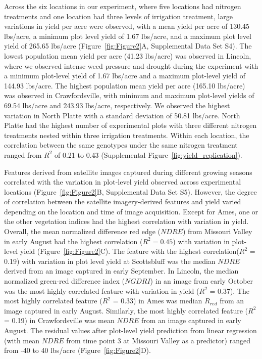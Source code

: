 \documentclass[12pt,twoside]{gsag3jnl}
\begin{document}
Across the six locations in our experiment, where five locations had nitrogen treatments and one location had three levels of irrigation treatment, large variations in yield per acre were observed, with a mean yield per acre of 130.45 lbs/acre, a minimum plot level yield of 1.67 lbs/acre, and a maximum plot level yield of 265.65 lbs/acre (Figure~\ref{fig:Figure2}A, Supplemental Data Set S4). The lowest population mean yield per acre (41.23 lbs/acre) was observed in Lincoln, where we observed intense weed pressure and drought during the experiment with a minimum plot-level yield of 1.67 lbs/acre and a maximum plot-level yield of 144.93 lbs/acre. The highest population mean yield per acre (165.10 lbs/acre) was observed in Crawfordsville, with minimum and maximum plot-level yields of 69.54 lbs/acre and 243.93 lbs/acre, respectively. We observed the highest variation in North Platte with a standard deviation of 50.81 lbs/acre. North Platte had the highest number of experimental plots with three different nitrogen treatments nested within three irrigation treatments. Within each location, the correlation between the same genotypes under the same nitrogen treatment ranged from $R^2$ of 0.21 to 0.43 (Supplemental Figure~\ref{fig:yield_replication}).

Features derived from satellite images captured during different growing seasons correlated with the variation in plot-level yield observed across experimental locations (Figure~\ref{fig:Figure2}B, Supplemental Data Set S5). However, the degree of correlation between the satellite imagery-derived features and yield varied depending on the location and time of image acquisition. Except for Ames, one or the other vegetation indices had the highest correlation with variation in yield. Overall, the mean normalized difference red edge ($NDRE$) from Missouri Valley in early August had the highest correlation ($R^2 = 0.45$) with variation in plot-level yield (Figure~\ref{fig:Figure2}C). The feature with the highest correlation($R^2$ = 0.19) with variation in plot level yield at Scottsbluff was the median $NDRE$ derived from an image captured in early September. In Lincoln, the median normalized green-red difference index ($NGDRI$) in an image from early October was the most highly correlated feature with variation in yield ($R^2$ = 0.37). The most highly correlated feature ($R^2$ = 0.33) in Ames was median $R_{red}$ from an image captured in early August. Similarly, the most highly correlated feature ($R^2$ = 0.19) in Crawfordsville was mean $NDRE$ from an image captured in early August. The residual values after plot-level yield prediction from linear regression (with mean $NDRE$ from time point 3 at Missouri Valley as a predictor) ranged from -40 to 40 lbs/acre (Figure~\ref{fig:Figure2}D).
\end{document}
